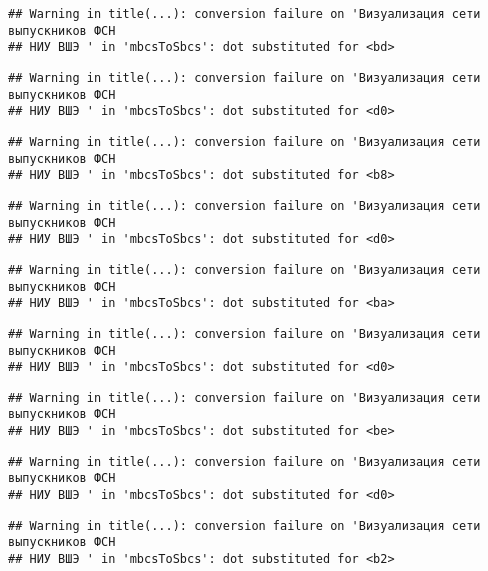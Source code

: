 \documentclass[
]{article}
\begin{document}
\begin{verbatim}
## Warning in title(...): conversion failure on 'Визуализация сети выпускников ФСН
## НИУ ВШЭ ' in 'mbcsToSbcs': dot substituted for <bd>
\end{verbatim}

\begin{verbatim}
## Warning in title(...): conversion failure on 'Визуализация сети выпускников ФСН
## НИУ ВШЭ ' in 'mbcsToSbcs': dot substituted for <d0>
\end{verbatim}

\begin{verbatim}
## Warning in title(...): conversion failure on 'Визуализация сети выпускников ФСН
## НИУ ВШЭ ' in 'mbcsToSbcs': dot substituted for <b8>
\end{verbatim}

\begin{verbatim}
## Warning in title(...): conversion failure on 'Визуализация сети выпускников ФСН
## НИУ ВШЭ ' in 'mbcsToSbcs': dot substituted for <d0>
\end{verbatim}

\begin{verbatim}
## Warning in title(...): conversion failure on 'Визуализация сети выпускников ФСН
## НИУ ВШЭ ' in 'mbcsToSbcs': dot substituted for <ba>
\end{verbatim}

\begin{verbatim}
## Warning in title(...): conversion failure on 'Визуализация сети выпускников ФСН
## НИУ ВШЭ ' in 'mbcsToSbcs': dot substituted for <d0>
\end{verbatim}

\begin{verbatim}
## Warning in title(...): conversion failure on 'Визуализация сети выпускников ФСН
## НИУ ВШЭ ' in 'mbcsToSbcs': dot substituted for <be>
\end{verbatim}

\begin{verbatim}
## Warning in title(...): conversion failure on 'Визуализация сети выпускников ФСН
## НИУ ВШЭ ' in 'mbcsToSbcs': dot substituted for <d0>
\end{verbatim}

\begin{verbatim}
## Warning in title(...): conversion failure on 'Визуализация сети выпускников ФСН
## НИУ ВШЭ ' in 'mbcsToSbcs': dot substituted for <b2>
\end{verbatim}
\end{document}
